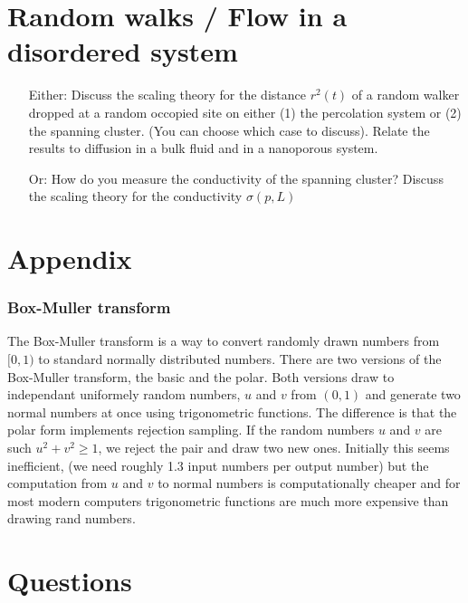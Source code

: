 \documentclass[a4paper, 11pt, notitlepage, english]{article}
\begin{document}
\clearpage


\section{ Random walks / Flow in a disordered system}
\begin{itemize}
	\item[Either:] Discuss the scaling theory for the distance $r^2(t)$ of a random walker
dropped at a random occopied site on either (1) the percolation system or (2)
the spanning cluster. (You can choose which case to discuss). Relate the results
to diffusion in a bulk fluid and in a nanoporous system.
\item[Or: ] How do you measure the conductivity of the spanning cluster? Discuss the
scaling theory for the conductivity $\sigma(p, L)$
\end{itemize}

\clearpage

\section*{Appendix}

\subsubsection*{Box-Muller transform}

The Box-Muller transform is a way to convert randomly drawn numbers from $[0,1)$ to standard normally distributed numbers. There are two versions of the Box-Muller transform, the basic and the polar. Both versions draw to independant uniformely random numbers, $u$ and $v$ from $(0,1)$ and generate two normal numbers at once using trigonometric functions. The difference is that the polar form implements rejection sampling. If the random numbers $u$ and $v$ are such $u^2 + v^2 \geq 1$, we reject the pair and draw two new ones. Initially this seems inefficient, (we need roughly 1.3 input numbers per output number) but the computation from $u$ and $v$ to normal numbers is computationally cheaper and for most modern computers trigonometric functions are much more expensive than drawing rand numbers.

\section*{Questions}
\end{document}
